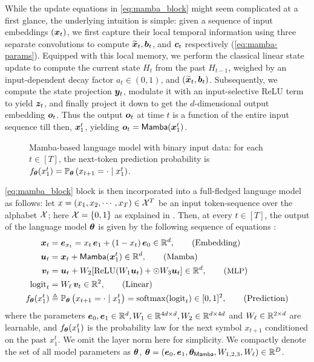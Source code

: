  While the update equations in \ref{eq:mamba_block} might seem complicated at a first glance, the underlying intuition is simple: given a sequence of input embeddings $(\boldsymbol{x}_t)$, we first capture their local temporal information using three separate convolutions to compute $\widetilde{\boldsymbol{x}}_t, \boldsymbol{b}_t$, and $\boldsymbol{c}_t$ respectively (\ref{eq:mamba-params}). Equipped with this local memory, we perform the classical linear state update to compute the current state $H_t$ from the past $H_{t-1}$, weighed by an input-dependent decay factor $a_t \in (0,1)$, and $(\widetilde{\boldsymbol{x}}_t, \boldsymbol{b}_t)$. Subsequently, we compute the state projection $\boldsymbol{y}_t$, modulate it with an input-selective ReLU term to yield $\boldsymbol{z}_t$, and finally project it down to get the $d$-dimensional output embedding $\boldsymbol{o}_t$. Thus the output $\boldsymbol{o}_t$ at time $t$ is a function of the entire input sequence till then, $\boldsymbol{x}_1^t$, yielding $ \boldsymbol{o}_t = \mathsf{Mamba}(\boldsymbol{x}_1^t)$. 

\begin{figure}[t]
\centering
   \scalebox{0.8}{} 
    \caption{Mamba-based language model with binary input data: for each $t\in [T]$, the next-token prediction probability is $f_{\boldsymbol{\theta}}(x_1^t)= \mathbb{P}_{\boldsymbol{\theta}}\left( x_{t+1}=\cdot \mid x_1^t \right)$.}
    \label{fig:mamba}
\end{figure}

  \ref{eq:mamba_block} block is then incorporated into a full-fledged language model as follows: let $ x= (x_1, x_2, \cdots, x_T) \in \mathcal{X}^T $ be an input token-sequence over the alphabet $\mathcal{X}$; here $\mathcal{X}= \{0,1\}$ as explained in . Then, at every $t\in [T]$, the output of the language model $\boldsymbol{\theta}$ is given by the following sequence of equations \cite{dao2024transformers}:
\begin{align}
\bx_t  &= \be
_{x_t} = x_t \, \be_1 + (1-x_t) \, \be_0 \inrd, \tag{{Embedding}}     \label{eq:embedding}  \\
\bu_t &= \bx_t + \mamba(\bx_1^t) \inrd, \tag{{Mamba}}\label{eq:mamba} \\
\bv_t &= \bu_t + W_2[ \relu(W_1 \bu_t) + \odot W_3 \bu_t ] \inrd, \tag{{\small MLP}} \label{eq:mlp} \\
\logit_t &= W_{\ell}\, \bv_t \inr{2}, \tag{{Linear}} \label{eq:logit} \\
f_{\btheta}(x_1^t) & \define \mathbb{P}_{\btheta}\pth{x_{t+1}= \cdot \mid x_1^t} = \softmax(\logit_t) \in [0,1]^2, \tag{{Prediction}} \label{eq:prediction}
\end{align}
where the parameters $\boldsymbol{e}_0, \boldsymbol{e}_1 \in \mathbb{R}^d, W_1 \in \mathbb{R}^{4d\times d}, W_2 \in \mathbb{R}^{d\times 4d}$ and $W_{\ell} \in \mathbb{R}^{2\times d}$ are learnable, and $f_{\boldsymbol{\theta}}(x_1^t)$ is the probability law for the next symbol $x_{t+1}$ conditioned on the past $x_1^t$. We omit the layer norm here for simplicity. We compactly denote the set of all model parameters as $\boldsymbol{\theta}$, \ie $\boldsymbol{\theta}= (\boldsymbol{e}_0, \boldsymbol{e}_1, \boldsymbol{\theta}_{\mathsf{Mamba}}, W_{1,2,3},  W_\ell) \in \mathbb{R}^{D} $. 



